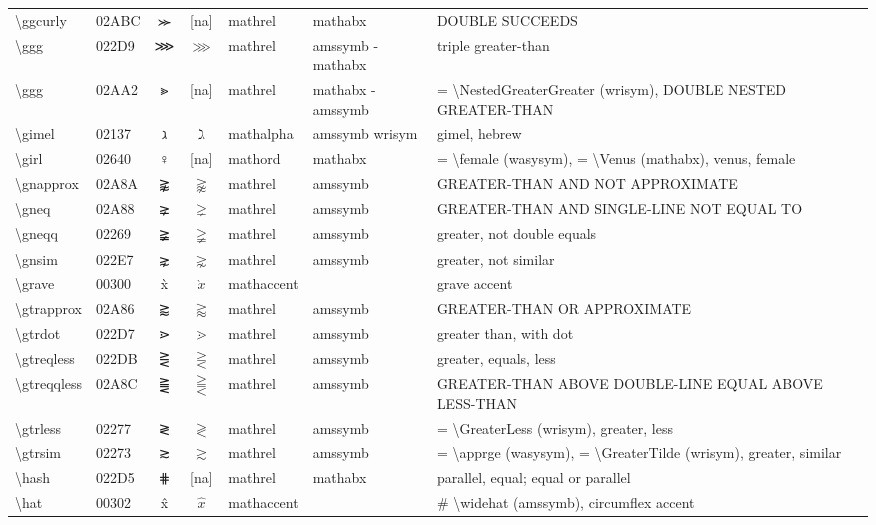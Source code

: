 \documentclass[a4paper,landscape]{article}
\begin{document}
\begin{longtable}{llcclll}
\textbackslash{}ggcurly & 02ABC & ⪼ & [na] & mathrel & mathabx & DOUBLE SUCCEEDS \\
\textbackslash{}ggg & 022D9 & ⋙ & $\ggg$ & mathrel & amssymb -mathabx & triple greater-than \\
\textbackslash{}ggg & 02AA2 & ⪢ & [na] & mathrel & mathabx -amssymb & = \textbackslash{}NestedGreaterGreater (wrisym),  DOUBLE NESTED GREATER-THAN \\
\textbackslash{}gimel & 02137 & ℷ & $\gimel$ & mathalpha & amssymb wrisym & gimel, hebrew \\
\textbackslash{}girl & 02640 & \textsf ♀ & [na] & mathord & mathabx & = \textbackslash{}female (wasysym), = \textbackslash{}Venus (mathabx),  venus,  female \\
\textbackslash{}gnapprox & 02A8A & ⪊ & $\gnapprox$ & mathrel & amssymb & GREATER-THAN AND NOT APPROXIMATE \\
\textbackslash{}gneq & 02A88 & ⪈ & $\gneq$ & mathrel & amssymb & GREATER-THAN AND SINGLE-LINE NOT EQUAL TO \\
\textbackslash{}gneqq & 02269 & ≩ & $\gneqq$ & mathrel & amssymb & greater, not double equals \\
\textbackslash{}gnsim & 022E7 & ⋧ & $\gnsim$ & mathrel & amssymb & greater, not similar \\
\textbackslash{}grave & 00300 & x̀ & $\grave{x}$ & mathaccent &  & grave accent \\
\textbackslash{}gtrapprox & 02A86 & ⪆ & $\gtrapprox$ & mathrel & amssymb & GREATER-THAN OR APPROXIMATE \\
\textbackslash{}gtrdot & 022D7 & ⋗ & $\gtrdot$ & mathrel & amssymb & greater than, with dot \\
\textbackslash{}gtreqless & 022DB & ⋛ & $\gtreqless$ & mathrel & amssymb & greater, equals, less \\
\textbackslash{}gtreqqless & 02A8C & ⪌ & $\gtreqqless$ & mathrel & amssymb & GREATER-THAN ABOVE DOUBLE-LINE EQUAL ABOVE LESS-THAN \\
\textbackslash{}gtrless & 02277 & ≷ & $\gtrless$ & mathrel & amssymb & = \textbackslash{}GreaterLess (wrisym), greater, less \\
\textbackslash{}gtrsim & 02273 & ≳ & $\gtrsim$ & mathrel & amssymb & = \textbackslash{}apprge (wasysym), = \textbackslash{}GreaterTilde (wrisym), greater, similar \\
\textbackslash{}hash & 022D5 & ⋕ & [na] & mathrel & mathabx & parallel, equal; equal or parallel \\
\textbackslash{}hat & 00302 & x̂ & $\hat{x}$ & mathaccent &  & \# \textbackslash{}widehat (amssymb), circumflex accent \\

\end{longtable}
\end{document}
